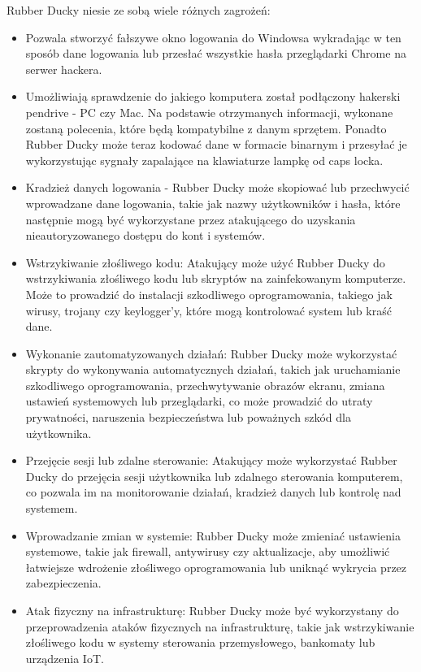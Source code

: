 \documentclass{article}
\begin{document}
Rubber Ducky niesie ze sobą wiele różnych zagrożeń:
\begin{itemize}
    \item Pozwala stworzyć fałszywe okno logowania do Windowsa wykradając w ten sposób dane logowania lub przesłać wszystkie hasła przeglądarki Chrome na serwer hackera. 
    \item Umożliwiają sprawdzenie do jakiego komputera został podłączony hakerski pendrive - PC czy Mac. Na podstawie otrzymanych informacji, wykonane zostaną polecenia, które będą kompatybilne z danym sprzętem. Ponadto Rubber Ducky może teraz kodować dane w formacie binarnym i przesyłać je wykorzystując sygnały zapalające na klawiaturze lampkę od caps locka.
    \item Kradzież danych logowania - Rubber Ducky może skopiować lub przechwycić wprowadzane dane logowania, takie jak nazwy użytkowników i hasła, które następnie mogą być wykorzystane przez atakującego do uzyskania nieautoryzowanego dostępu do kont i systemów.
    \item Wstrzykiwanie złośliwego kodu: Atakujący może użyć Rubber Ducky do wstrzykiwania złośliwego kodu lub skryptów na zainfekowanym komputerze. Może to prowadzić do instalacji szkodliwego oprogramowania, takiego jak wirusy, trojany czy keylogger'y, które mogą kontrolować system lub kraść dane.
    \item Wykonanie zautomatyzowanych działań: Rubber Ducky może wykorzystać skrypty do wykonywania automatycznych działań, takich jak uruchamianie szkodliwego oprogramowania, przechwytywanie obrazów ekranu, zmiana ustawień systemowych lub przeglądarki, co może prowadzić do utraty prywatności, naruszenia bezpieczeństwa lub poważnych szkód dla użytkownika.
    \item  Przejęcie sesji lub zdalne sterowanie: Atakujący może wykorzystać Rubber Ducky do przejęcia sesji użytkownika lub zdalnego sterowania komputerem, co pozwala im na monitorowanie działań, kradzież danych lub kontrolę nad systemem.
    \item Wprowadzanie zmian w systemie: Rubber Ducky może zmieniać ustawienia systemowe, takie jak firewall, antywirusy czy aktualizacje, aby umożliwić łatwiejsze wdrożenie złośliwego oprogramowania lub uniknąć wykrycia przez zabezpieczenia.
    \item  Atak fizyczny na infrastrukturę: Rubber Ducky może być wykorzystany do przeprowadzenia ataków fizycznych na infrastrukturę, takie jak wstrzykiwanie złośliwego kodu w systemy sterowania przemysłowego, bankomaty lub urządzenia IoT.

    
\end{itemize} 
\end{document}
